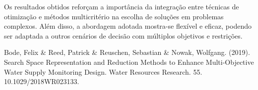 \documentclass[conference]{IEEEtran}
\begin{document}
Os resultados obtidos reforçam a importância da integração entre técnicas de otimização e métodos multicritério na escolha de soluções em problemas complexos. Além disso, a abordagem adotada mostra-se flexível e eficaz, podendo ser adaptada a outros cenários de decisão com múltiplos objetivos e restrições.


\begin{thebibliography}{1}

Bode, Felix \& Reed, Patrick \& Reuschen, Sebastian \& Nowak, Wolfgang. (2019). Search Space Representation and Reduction Methods to Enhance Multi-Objective Water Supply Monitoring Design. Water Resources Research. 55. 10.1029/2018WR023133. 


\end{thebibliography}
\end{document}
